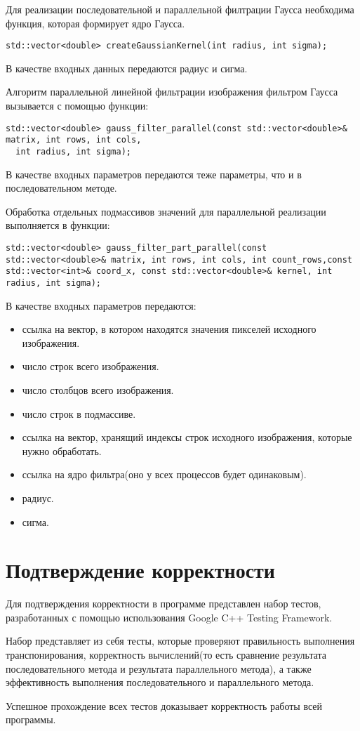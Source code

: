 \documentclass{report}
\begin{document}
\par Для реализации последовательной и параллельной филтрации Гаусса необходима функция, которая формирует ядро Гаусса.
\begin{lstlisting}
std::vector<double> createGaussianKernel(int radius, int sigma);
\end{lstlisting}
\par В качестве входных данных передаются радиус и сигма.
\par Алгоритм параллельной линейной фильтрации изображения фильтром Гаусса вызывается с помощью функции:
\begin{lstlisting}
std::vector<double> gauss_filter_parallel(const std::vector<double>& matrix, int rows, int cols,
  int radius, int sigma);
\end{lstlisting}
\par В качестве входных параметров передаются теже параметры, что и в последовательном методе.
\par Обработка отдельных подмассивов значений для параллельной реализации выполняется в функции:
\begin{lstlisting}
std::vector<double> gauss_filter_part_parallel(const std::vector<double>& matrix, int rows, int cols, int count_rows,const std::vector<int>& coord_x, const std::vector<double>& kernel, int radius, int sigma);
\end{lstlisting}
\par В качестве входных параметров передаются:
\begin{itemize}
\item ссылка на вектор, в котором находятся значения пикселей исходного изображения.
\item число строк всего изображения.
\item число столбцов всего изображения.
\item число строк в подмассиве.
\item ссылка на вектор, хранящий индексы строк исходного изображения, которые нужно обработать.
\item ссылка на ядро фильтра(оно у всех процессов будет одинаковым).
\item радиус.
\item сигма.
\end{itemize}
\newpage

\section*{Подтверждение корректности}
Для подтверждения корректности в программе представлен набор тестов, разработанных с помощью использования Google C++ Testing Framework.
\par Набор представляет из себя тесты, которые проверяют правильность выполнения транспонирования, корректность вычислений(то есть сравнение результата последовательного метода и результата параллельного метода), а также эффективность выполнения последовательного и параллельного метода.
\par Успешное прохождение всех тестов доказывает корректность работы всей программы.
\newpage
\end{document}
